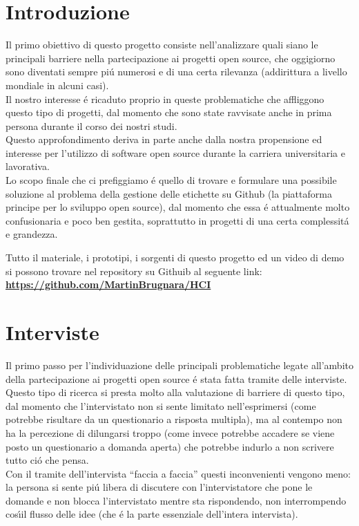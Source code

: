 \documentclass[12pt]{article} %
\begin{document}
\section{Introduzione}
Il primo obiettivo di questo progetto consiste nell'analizzare quali siano le principali barriere nella partecipazione ai progetti open source, che oggigiorno sono diventati sempre pi\'u numerosi e di una certa rilevanza (addirittura a livello mondiale in alcuni casi).\\
Il nostro interesse \'e ricaduto proprio in queste problematiche che affliggono questo tipo di progetti, dal momento che sono state ravvisate anche in prima persona durante il corso dei nostri studi.\\
Questo approfondimento deriva in parte anche dalla nostra propensione ed interesse per l'utilizzo di software open source durante la carriera universitaria e lavorativa.\\
Lo scopo finale che ci prefiggiamo \'e quello di trovare e formulare una possibile soluzione al problema della gestione delle etichette su Github (la piattaforma principe per lo sviluppo open source), dal momento che essa \'e attualmente molto confusionaria e poco ben gestita, soprattutto in progetti di una certa complessit\'a e grandezza.\\
\vfill
\begin{center}
Tutto il materiale, i prototipi, i sorgenti di questo progetto ed un video di demo si possono trovare nel repository su Githuib al seguente link:\\
\textbf{\url{https://github.com/MartinBrugnara/HCI}}
\end{center}

\newpage

\section{Interviste}
Il primo passo per l'individuazione delle principali problematiche legate all'ambito della partecipazione ai progetti open source \'e stata fatta tramite delle interviste. Questo tipo di ricerca si presta molto alla valutazione di barriere di questo tipo, dal momento che l'intervistato non si sente limitato nell'esprimersi (come potrebbe risultare da un questionario a risposta multipla), ma al contempo non ha la percezione di dilungarsi troppo (come invece potrebbe accadere se viene posto un questionario a domanda aperta) che potrebbe indurlo a non scrivere tutto ci\'o che pensa.\\
Con il tramite dell'intervista ``faccia a faccia'' questi inconvenienti vengono meno: la persona si sente pi\'u libera di discutere con l'intervistatore che pone le domande e non blocca l'intervistato mentre sta rispondendo, non interrompendo cos\'\i il flusso delle idee (che \'e la parte essenziale dell'intera intervista).\\
\end{document}
